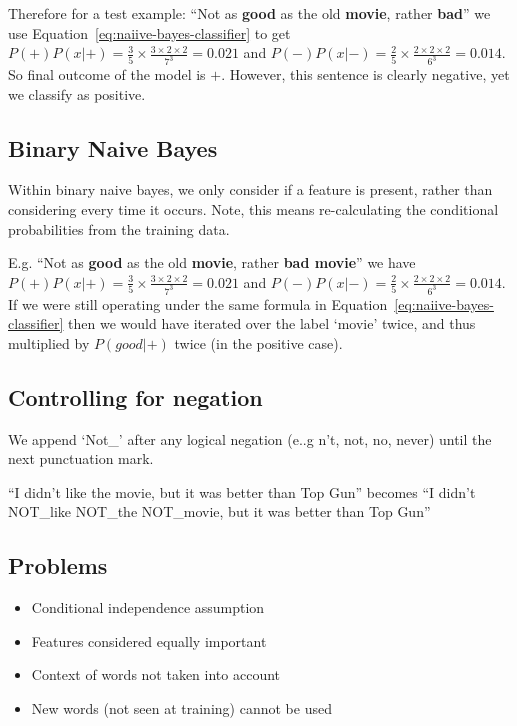 \documentclass[11pt]{article}
\begin{document}
Therefore for a test example: ``Not as \textbf{good} as the old \textbf{movie}, rather \textbf{bad}'' we use Equation~\ref{eq:naiive-bayes-classifier} to get $P(+)P(x|+) = \frac 3 5 \times \frac{3\times 2 \times 2}{7^3} = 0.021$ and $P(-)P(x|-) = \frac 2 5 \times \frac{2\times 2 \times 2}{6^3} = 0.014$. So final outcome of the model is $+$. However, this sentence is clearly negative, yet we classify as positive.

\subsection{Binary Naive Bayes}

Within binary naive bayes, we only consider if a feature is present, rather than considering every time it occurs. Note, this means re-calculating the conditional probabilities from the training data.

E.g. ``Not as \textbf{good} as the old \textbf{movie}, rather \textbf{bad movie}'' we have $P(+)P(x|+) = \frac 3 5 \times \frac{3\times 2 \times 2}{7^3} = 0.021$ and $P(-)P(x|-) = \frac 2 5 \times \frac{2 \times 2 \times 2}{6^3} = 0.014$. If we were still operating under the same formula in Equation~\ref{eq:naiive-bayes-classifier} then we would have iterated over the label `movie' twice, and thus multiplied by $P(good|+)$ twice (in the positive case).

\subsection{Controlling for negation}

We append `Not\_' after any logical negation (e..g n't, not, no, never) until the next punctuation mark.

``I didn't like the movie, but it was better than Top Gun'' becomes ``I didn't NOT\_like NOT\_the NOT\_movie, but it was better than Top Gun''

\subsection{Problems}

\begin{itemize}
    \item Conditional independence assumption
    \item Features considered equally important
    \item Context of words not taken into account
    \item New words (not seen at training) cannot be used
\end{itemize}
\end{document}
